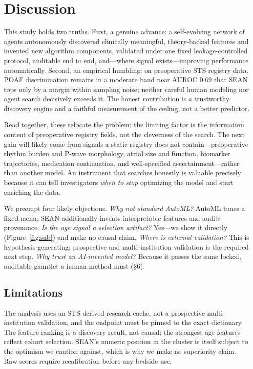 \documentclass[11pt]{article}
\newcommand{\sean}{SEAN}
\begin{document}
\section{Discussion}
This study holds two truths. First, a genuine advance: a self-evolving network of agents
autonomously discovered clinically meaningful, theory-backed features and invented new
algorithm components, validated under one fixed leakage-controlled protocol, auditable end to
end, and---where signal exists---improving performance automatically. Second, an empirical
humbling: on preoperative STS registry data, POAF discrimination remains in a moderate band near
AUROC 0.69 that \sean{} tops only by a margin within sampling noise; neither careful human
modeling nor agent search decisively exceeds it. The honest contribution is a
trustworthy discovery engine and a faithful measurement of the ceiling, not a better predictor.

Read together, these relocate the problem: the limiting factor is the information content of
preoperative registry fields, not the cleverness of the search. The next gain will likely come
from signals a static registry does not contain---preoperative rhythm burden and P-wave
morphology, atrial size and function, biomarker trajectories, medication continuation, and
well-specified ascertainment---rather than another model. An instrument that searches honestly
is valuable precisely because it can tell investigators \emph{when to stop} optimizing the
model and start enriching the data.

We preempt four likely objections. \emph{Why not standard AutoML?} AutoML tunes a fixed menu;
\sean{} additionally invents interpretable features and audits provenance. \emph{Is the age
signal a selection artifact?} Yes---we show it directly (Figure~\ref{fig:sub}) and make no
causal claim. \emph{Where is external validation?} This is hypothesis-generating; prospective
and multi-institution validation is the required next step. \emph{Why trust an AI-invented
model?} Because it passes the same locked, auditable gauntlet a human method must (\S6).

\subsection*{Limitations}
The analysis uses an STS-derived research cache, not a prospective multi-institution validation,
and the endpoint must be pinned to the exact dictionary. The feature ranking is a discovery
result, not causal; the strongest age features reflect cohort selection. \sean{}'s numeric
position in the cluster is itself subject to the optimism we caution against, which is why we
make no superiority claim. Raw scores require recalibration before any bedside use.
\end{document}
